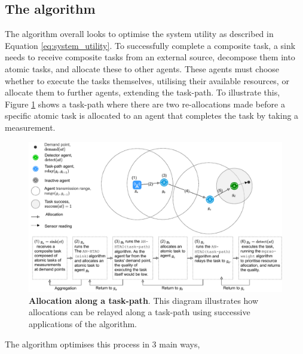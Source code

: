 \newcommand{\functionANHTAO}[2]{
	\functionSignature{\texttt{anhtao-path}}{\varAtomicTask{}{}, \varAgent{}{}}
}

\subsection{The \acronymWSNOptimisationExtended{}{} algorithm}
\label{section:solution_anhtao}

The \acronymWSNOptimisation{}{} algorithm overall looks to optimise the system utility as described in Equation \ref{eq:system_utility}. 
To successfully complete a composite task, a sink needs to receive composite tasks from an external source, decompose them into atomic tasks, and allocate these to other agents. These agents must choose whether to execute the tasks themselves, utilising their available resources, or allocate them to further agents, extending the task-path.  To illustrate this, Figure \ref{fig:arc-flow} shows a task-path where there are two re-allocations made before a specific atomic task is allocated to an agent that completes the task by taking a measurement.
\begin{figure}[ht]
	\centering
	\includegraphics[width=0.8\linewidth, trim={72pt 0pt 62pt 0pt, clip}]{arc-flow}
	\caption{\textbf{Allocation along a task-path}. This diagram illustrates how allocations can be relayed along a task-path using successive applications of the \acronymATARIA{}{} algorithm.}
	\label{fig:arc-flow}
\end{figure}
The \acronymWSNOptimisation{}{} algorithm optimises this process  in 3 main ways,
